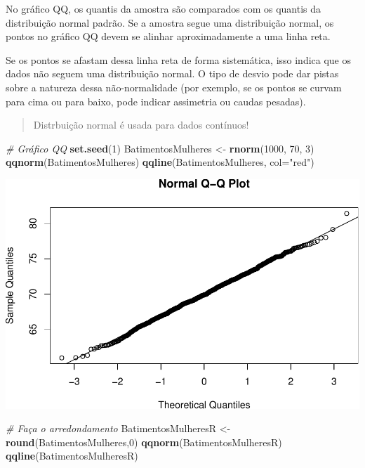 \documentclass[
]{book}
\newenvironment{Shaded}{\begin{snugshade}}{\end{snugshade}}
\newcommand{\AttributeTok}[1]{\textcolor[rgb]{0.13,0.29,0.53}{#1}}
\newcommand{\CommentTok}[1]{\textcolor[rgb]{0.56,0.35,0.01}{\textit{#1}}}
\newcommand{\DecValTok}[1]{\textcolor[rgb]{0.00,0.00,0.81}{#1}}
\newcommand{\FunctionTok}[1]{\textcolor[rgb]{0.13,0.29,0.53}{\textbf{#1}}}
\newcommand{\NormalTok}[1]{#1}
\newcommand{\OtherTok}[1]{\textcolor[rgb]{0.56,0.35,0.01}{#1}}
\newcommand{\StringTok}[1]{\textcolor[rgb]{0.31,0.60,0.02}{#1}}
\begin{document}
No gráfico QQ, os quantis da amostra são comparados com os quantis da distribuição normal padrão. Se a amostra segue uma distribuição normal, os pontos no gráfico QQ devem se alinhar aproximadamente a uma linha reta.

Se os pontos se afastam dessa linha reta de forma sistemática, isso indica que os dados não seguem uma distribuição normal. O tipo de desvio pode dar pistas sobre a natureza dessa não-normalidade (por exemplo, se os pontos se curvam para cima ou para baixo, pode indicar assimetria ou caudas pesadas).

\begin{quote}
Distrbuição normal é usada para dados contínuos!
\end{quote}

\begin{Shaded}
\begin{Highlighting}[]
\CommentTok{\# Gráfico QQ}
\FunctionTok{set.seed}\NormalTok{(}\DecValTok{1}\NormalTok{)}
\NormalTok{BatimentosMulheres }\OtherTok{\textless{}{-}} \FunctionTok{rnorm}\NormalTok{(}\DecValTok{1000}\NormalTok{, }\DecValTok{70}\NormalTok{, }\DecValTok{3}\NormalTok{)}
\FunctionTok{qqnorm}\NormalTok{(BatimentosMulheres)}
\FunctionTok{qqline}\NormalTok{(BatimentosMulheres, }\AttributeTok{col=}\StringTok{"red"}\NormalTok{)}
\end{Highlighting}
\end{Shaded}

\includegraphics{Livro-Estatistica+R_files/figure-latex/unnamed-chunk-33-1.pdf}

\begin{Shaded}
\begin{Highlighting}[]
\CommentTok{\# Faça o arredondamento}
\NormalTok{BatimentosMulheresR }\OtherTok{\textless{}{-}} \FunctionTok{round}\NormalTok{(BatimentosMulheres,}\DecValTok{0}\NormalTok{)}
\FunctionTok{qqnorm}\NormalTok{(BatimentosMulheresR)}
\FunctionTok{qqline}\NormalTok{(BatimentosMulheresR)}
\end{Highlighting}
\end{Shaded}
\end{document}
